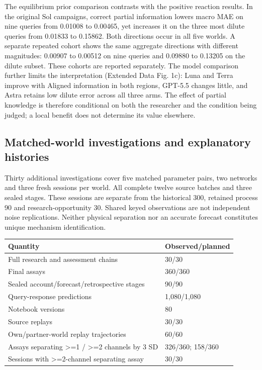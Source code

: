 \documentclass[10pt,a4paper]{article}
\begin{document}
The equilibrium prior comparison contrasts with the positive reaction results. In the original Sol campaigns, correct partial information lowers macro MAE on nine queries from 0.01008 to 0.00465, yet increases it on the three most dilute queries from 0.01833 to 0.15862. Both directions occur in all five worlds. A separate repeated cohort shows the same aggregate directions with different magnitudes: 0.00907 to 0.00512 on nine queries and 0.09880 to 0.13205 on the dilute subset. These cohorts are reported separately. The model comparison further limits the interpretation (Extended Data Fig. 1c): Luna and Terra improve with Aligned information in both regions, GPT-5.5 changes little, and Astra retains low dilute error across all three arms. The effect of partial knowledge is therefore conditional on both the researcher and the condition being judged; a local benefit does not determine its value elsewhere.

\subsection{Matched-world investigations and explanatory histories}\label{matched-world-investigations-and-explanatory-histories}

Thirty additional investigations cover five matched parameter pairs, two networks and three fresh sessions per world. All complete twelve source batches and three sealed stages. These sessions are separate from the historical 300, retained process 90 and research-opportunity 30. Shared keyed observations are not independent noise replications. Neither physical separation nor an accurate forecast constitutes unique mechanism identification.

{\def\LTcaptype{table} %
\small\begin{longtable}[]{@{}ll@{}}
\toprule\noalign{}
Quantity & Observed/planned \\
\midrule\noalign{}
\endhead
\bottomrule\noalign{}
\endlastfoot
Full research and assessment chains & 30/30 \\
Final assays & 360/360 \\
Sealed account/forecast/retrospective stages & 90/90 \\
Query-response predictions & 1,080/1,080 \\
Notebook versions & 80 \\
Source replays & 30/30 \\
Own/partner-world replay trajectories & 60/60 \\
Assays separating \textgreater=1 / \textgreater=2 channels by 3 SD & 326/360; 158/360 \\
Sessions with \textgreater=2-channel separating assay & 30/30 \\
\end{longtable}\normalsize
}
\end{document}
